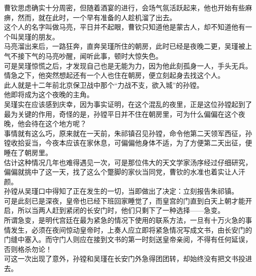 \begin{multicols}{\theparacolNo}
曹钦思虑确实十分周密，但随着酒宴的进行，会场气氛活跃起来，他也开始有些麻痹，然而，就在此时，一个早有准备的人趁机溜了出去。\\

这个人的名字叫做马亮，平日并不起眼，曹钦只知道他是蒙古人，却不知道他有一个叫吴瑾的朋友。\\

马亮溜出来后，一路狂奔，直奔吴瑾所住的朝房，此时已经是夜晚二更，吴瑾被上气不接下气的马亮吵醒，闻听此事，顿时大惊失色。\\

可是吴瑾惊慌之后，才发现自己也是无能为力，因为他此刻孤身一人，手头无兵。情急之下，他突然想起还有一个人也住在朝房，便立刻起身去找这个人。\\

此人就是十二年前北京保卫战中那个“力战不支，欲入城”的孙镗。\\

他即将成为这个夜晚的主角。\\

吴瑾实在应该感到庆幸，因为事实证明，在这个混乱的夜里，正是这位孙镗起到了最为关键的作用，奇怪的是，孙镗平日并不住在朝房里，可为什么偏偏在这个夜晚，他会待在这个地方呢？\\

事情就有这么巧，原来就在一天前，朱祁镇召见孙镗，命令他第二天领军西征，孙镗收拾妥当，今夜本应该在家休息，可偏偏他身体不适，为了方便第二天出征，便睡在了朝房里。\\

估计这种情况几年也难得遇见一次，可是那位伟大的天文学家汤序经过仔细研究，偏偏就挑中了这一天，找了这么个蹩脚的家伙当同党，曹钦的水准也着实让人汗颜。\\

孙镗从吴瑾口中得知了正在发生的一切，当即做出了决定：立刻报告朱祁镇。\\

可是此刻已是深夜，皇帝也已经下班回家睡觉了，而皇宫的门直到白天上朝才能开启，所以当两人赶到紧闭的长安门时，他们只剩下了一种选择——急变。\\

所谓急变，是明代宫廷在最为紧急的情况下使用的联系方法，一旦有十万火急的事情发生，必须在夜间惊动皇帝时，上奏人应立即将紧急情况写成文书，由长安门的门缝中塞入。而守门人则应在接到文书的第一时刻送皇帝亲阅，不得有任何延误，否则格杀勿论！\\

可这一次出现了意外，孙镗和吴瑾在长安门外急得团团转，却始终没有把文书投进去。\\


\end{multicols}
